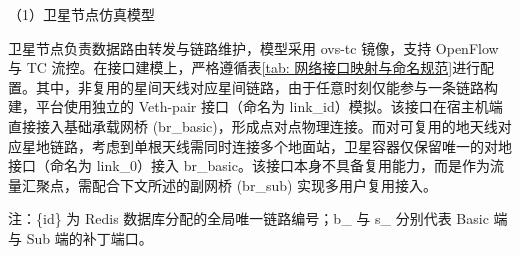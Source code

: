 \documentclass[print, master, vlined]{DissertUESTC}
\begin{document}
   （1）卫星节点仿真模型
   
   卫星节点负责数据路由转发与链路维护，模型采用 ovs-tc 镜像，支持 OpenFlow 与 TC 流控。在接口建模上，严格遵循表\ref{tab: 网络接口映射与命名规范}进行配置。其中，非复用的星间天线对应星间链路，由于任意时刻仅能参与一条链路构建，平台使用独立的 Veth-pair 接口（命名为 link\_{id}）模拟。该接口在宿主机端直接接入基础承载网桥 (br\_basic)，形成点对点物理连接。而对可复用的地天线对应星地链路，考虑到单根天线需同时连接多个地面站，卫星容器仅保留唯一的对地接口（命名为 link\_0）接入 br\_basic。该接口本身不具备复用能力，而是作为流量汇聚点，需配合下文所述的副网桥 (br\_sub) 实现多用户复用接入。

    \begin{table}[!htb]
        \centering
        \caption{网络接口映射与命名规范}
        \label{tab: 网络接口映射与命名规范}
        
        \begin{threeparttable}
            
            \begin{tablenotes}
				\item[] 注：\{id\} 为 Redis 数据库分配的全局唯一链路编号；b\_ 与 s\_ 分别代表 Basic 端与 Sub 端的补丁端口。
			\end{tablenotes}
        \end{threeparttable}
    \end{table}
    
\end{document}
